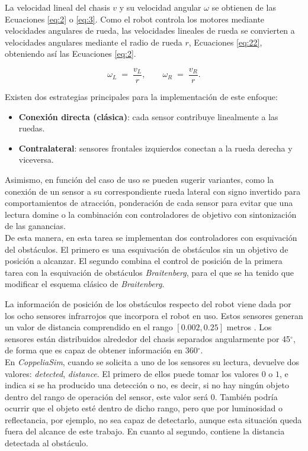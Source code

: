 La velocidad lineal del chasis \(v\) y su velocidad angular
\(\omega\) se obtienen de las Ecuaciones \ref{eq:2} o \ref{eq:3}. 
Como el robot controla los motores mediante velocidades angulares 
de rueda, las velocidades lineales de rueda se convierten a 
velocidades angulares mediante el radio de rueda \(r\), Ecuaciones \ref{eq:22},
obteniendo así las Ecuaciones \ref{eq:2}.

\begin{equation}
  \omega_L \;=\; \frac{v_L}{r}, \qquad
  \omega_R \;=\; \frac{v_R}{r}.
  \label{eq:22}
\end{equation}

Existen dos estrategias principales para la implementación de este enfoque:
\begin{itemize}
  \item \textbf{Conexión directa (clásica)}: cada sensor contribuye linealmente a las ruedas.
  \item \textbf{Contralateral}: sensores frontales izquierdos conectan a la rueda derecha y viceversa.
\end{itemize}

Asimismo, en función del caso de uso se pueden sugerir variantes, como la conexión de un sensor 
a su correspondiente rueda lateral con signo invertido para comportamientos de atracción, 
ponderación de cada sensor para evitar que una lectura domine o la combinación con controladores de
objetivo con sintonización de las ganancias. \\

De esta manera, en esta tarea se implementan dos controladores con esquivación del obstáculos. 
El primero es una esquivación de obstáculos sin un objetivo de posición a alcanzar. El 
segundo combina el control de posición de la primera tarea con la esquivación de obstáculos 
\textit{Braitenberg}, para el que se ha tenido que modificar el esquema clásico de \textit{Braitenberg}.

La información de posición de los obstáculos respecto del robot viene dada por los 
ocho sensores infrarrojos que incorpora el robot en uso. Estos sensores generan 
un valor de distancia comprendido en el rango $[0.002, 0.25]$ metros \cite{kheperaiv_manual_rev3}.
Los sensores están distribuidos alrededor del chasis separados angularmente por 45$^\circ$, 
de forma que es capaz de obtener información en 360$^\circ$. \\

En \textit{CoppeliaSim}, cuando se solicita a uno de los sensores su lectura,
devuelve dos valores: \textit{detected}, \textit{distance}. El primero de ellos
puede tomar los valores $0$ o $1$, e indica si se ha producido una detección o no, es 
decir, si no hay ningún objeto dentro del rango de operación del sensor, este valor 
será $0$. También podría ocurrir que el objeto esté dentro de dicho rango, 
pero que por luminosidad o reflectancia, por ejemplo, no sea capaz de detectarlo,
aunque esta situación queda fuera del alcance de este trabajo. En cuanto al segundo,
contiene la distancia detectada al obstáculo. \\

